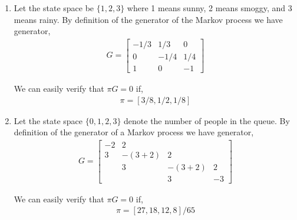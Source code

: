 \begin{solution}[Solution]
\begin{enumerate}[label=(\alph*)]
    \item Let the state space be \( \{1,2,3\} \) where 1 means sunny, 2 means smoggy, and 3 means rainy.
        By definition of the generator of the Markov process we have generator,
        \begin{align*}
            G = \left[\begin{array}{rrr}
            -1/3 & 1/3 & 0 \\
                0 & -1/4 & 1/4 \\
            1 & 0 & -1
            \end{array}\right]
        \end{align*}
        
        We can easily verify that \( \pi G = 0 \) if,
        \begin{align*}
            \pi = [3/8,1/2,1/8]
        \end{align*} 

    \item 
        Let the state space \( \{0,1,2,3\} \) denote the number of people in the queue. 
        By definition of the generator of a Markov process we have generator,
        \begin{align*}
            G= \left[\begin{array}{rrrr}
                -2 & 2 \\
                3 & -(3+2) & 2 \\
                & 3 & -(3+2) & 2 \\
                & & 3 & -3
            \end{array}\right]
        \end{align*}

        We can easily verify that \( \pi G = 0 \) if,
        \begin{align*}
            \pi = [27, 18, 12 , 8]/65
        \end{align*}     


\end{enumerate}
\end{solution}


